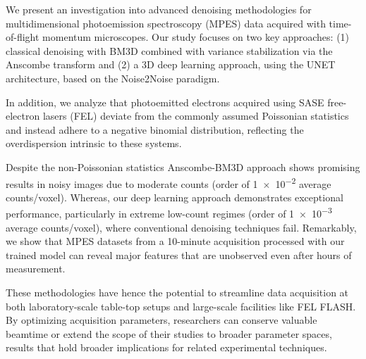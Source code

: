 We present an investigation into advanced denoising methodologies for multidimensional photoemission spectroscopy (MPES) data acquired with time-of-flight momentum microscopes. Our study focuses on two key approaches: (1) classical denoising with BM3D combined with variance stabilization via the Anscombe transform and (2) a 3D deep learning approach, using the UNET architecture, based on the Noise2Noise paradigm. 

In addition, we analyze that photoemitted electrons acquired using SASE free-electron lasers (FEL) deviate from the commonly assumed Poissonian statistics and instead adhere to a negative binomial distribution, reflecting the overdispersion intrinsic to these systems. 

Despite the non-Poissonian statistics Anscombe-BM3D approach shows promising results in noisy images due to moderate counts (order of \num{1e-2} average counts/voxel). Whereas, our deep learning approach demonstrates exceptional performance, particularly in extreme low-count regimes (order of \num{1e-3} average counts/voxel), where conventional denoising techniques fail. Remarkably, we show that MPES datasets from a 10-minute acquisition processed with our trained model can reveal major features that are unobserved even after hours of measurement. 

These methodologies have hence the potential to streamline data acquisition at both laboratory-scale table-top setups and large-scale facilities like FEL FLASH. By optimizing acquisition parameters, researchers can conserve valuable beamtime or extend the scope of their studies to broader parameter spaces, results that hold broader implications for related experimental techniques.